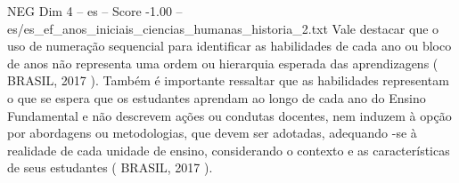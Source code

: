 \begin{textsample}{NEG Dim 4 – es – Score -1.00 – es/es\_ef\_anos\_iniciais\_ciencias\_humanas\_historia\_2.txt}
Vale destacar que o uso de numeração sequencial para identificar as habilidades de cada ano ou bloco de anos não representa uma ordem ou hierarquia esperada das aprendizagens ( BRASIL, 2017 ).
Também é importante ressaltar que as habilidades representam o que se espera que os estudantes aprendam ao longo de cada ano do Ensino Fundamental e não descrevem ações ou condutas docentes, nem induzem à opção por abordagens ou metodologias, que devem ser adotadas, adequando -se à realidade de cada unidade de ensino, considerando o contexto e as características de seus estudantes ( BRASIL, 2017 ).

\end{textsample}
